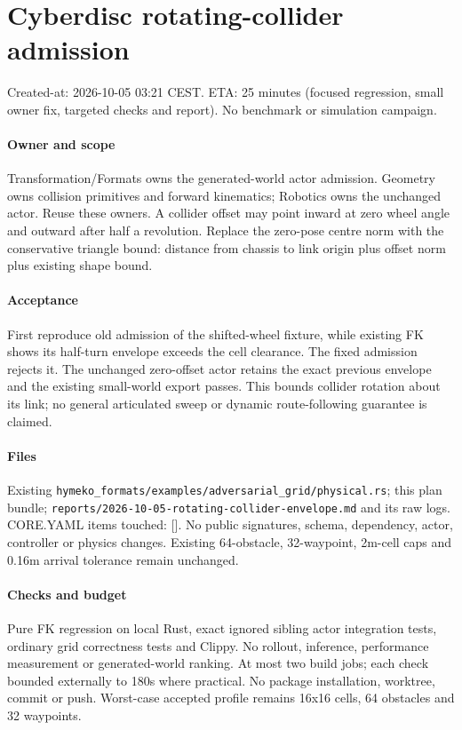 \documentclass{article}
\begin{document}
\section*{Cyberdisc rotating-collider admission}
Created-at: 2026-10-05 03:21 CEST. ETA: 25 minutes (focused regression, small
owner fix, targeted checks and report). No benchmark or simulation campaign.

\paragraph{Owner and scope} Transformation/Formats owns the generated-world
actor admission. Geometry owns collision primitives and forward kinematics;
Robotics owns the unchanged actor. Reuse these owners. A collider offset may
point inward at zero wheel angle and outward after half a revolution. Replace
the zero-pose centre norm with the conservative triangle bound: distance from
chassis to link origin plus offset norm plus existing shape bound.

\paragraph{Acceptance} First reproduce old admission of the shifted-wheel
fixture, while existing FK shows its half-turn envelope exceeds the cell
clearance. The fixed admission rejects it. The unchanged zero-offset actor
retains the exact previous envelope and the existing small-world export passes.
This bounds collider rotation about its link; no general articulated sweep or
dynamic route-following guarantee is claimed.

\paragraph{Files} Existing
\texttt{hymeko\_formats/examples/adversarial\_grid/physical.rs}; this plan bundle;
\texttt{reports/2026-10-05-rotating-collider-envelope.md} and its raw logs.
CORE.YAML items touched: []. No public signatures, schema, dependency, actor,
controller or physics changes. Existing 64-obstacle, 32-waypoint, 2m-cell caps
and 0.16m arrival tolerance remain unchanged.

\paragraph{Checks and budget} Pure FK regression on local Rust, exact ignored
sibling actor integration tests, ordinary grid correctness tests and Clippy.
No rollout, inference, performance measurement or generated-world ranking.
At most two build jobs; each check bounded externally to 180s where practical.
No package installation, worktree, commit or push. Worst-case accepted profile
remains 16x16 cells, 64 obstacles and 32 waypoints.
\end{document}
